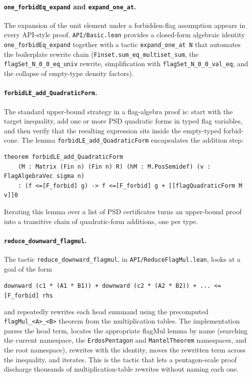 \documentclass{article}
\newcommand{\lean}[1]{\texttt{#1}}
\begin{document}
\paragraph{\lean{one\_forbidEq\_expand} and \lean{expand\_one\_at}.}
The expansion of the unit element under a forbidden-flag assumption appears
in every API-style proof.  \lean{API/Basic.lean} provides a closed-form
algebraic identity \lean{one\_forbidEq\_expand} together with a tactic
\lean{expand\_one\_at N} that automates the boilerplate rewrite chain
(\lean{Finset.sum\_eq\_multiset\_sum}, the \lean{flagSet\_N\_0\_0\_eq\_univ}
rewrite, simplification with \lean{flagSet\_N\_0\_0\_val\_eq}, and the
collapse of empty-type density factors).

\paragraph{\lean{forbidLE\_add\_QuadraticForm}.}
The standard upper-bound strategy in a flag-algebra proof is: start with the
target inequality, add one or more PSD quadratic forms in typed flag
variables, and then verify that the resulting expression sits inside the
empty-typed forbid-cone.  The lemma
\lean{forbidLE\_add\_QuadraticForm} encapsulates the addition step:
\begin{lstlisting}
theorem forbidLE_add_QuadraticForm
    (M : Matrix (Fin n) (Fin n) R) (hM : M.PosSemidef) (v : FlagAlgebraVec sigma n)
    : (f <=[F_forbid] g) -> f <=[F_forbid] g + [[flagQuadraticForm M v]]0
\end{lstlisting}
Iterating this lemma over a list of PSD certificates turns an upper-bound
proof into a transitive chain of quadratic-form additions, one per type.

\paragraph{\lean{reduce\_downward\_flagmul}.}
The tactic \lean{reduce\_downward\_flagmul}, in
\lean{API/ReduceFlagMul.lean}, looks at a goal of the form
\begin{center}
\lean{downward (c1 * (A1 * B1)) + downward (c2 * (A2 * B2)) + ... <=[F\_forbid] rhs}
\end{center}
and repeatedly rewrites each head summand using the precomputed
\lean{flagMul\_<A>\_<B>} theorem from the multiplication tables.  The
implementation parses the head term, locates the appropriate flagMul lemma
by name (searching the current namespace, the \lean{ErdosPentagon} and
\lean{MantelTheorem} namespaces, and the root namespace), rewrites with the
identity, moves the rewritten term across the inequality, and iterates.  This
is the tactic that lets a pentagon-scale proof discharge thousands of
multiplication-table rewrites without naming each one.
\end{document}
